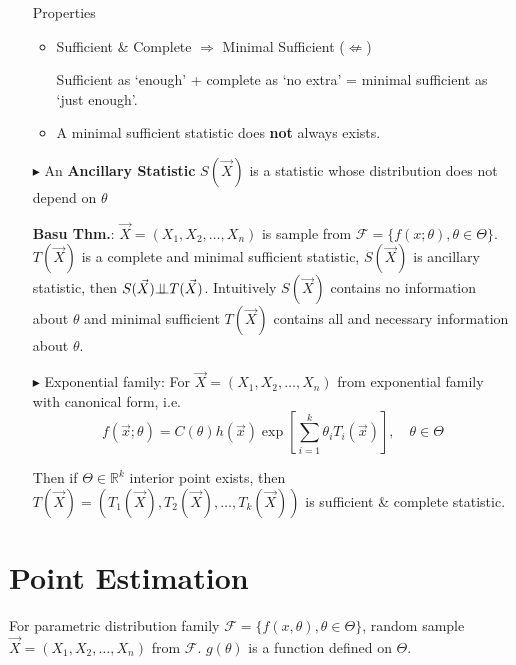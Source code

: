 \begin{itemize}
        Properties
        \begin{itemize}[topsep=2pt,itemsep=0pt]
            \item Sufficient \& Complete $\Rightarrow $ Minimal Sufficient ($ \not\Leftarrow $)
            
            Sufficient as `enough' + complete as `no extra' = minimal sufficient as `just enough'.
            

            \item A minimal sufficient statistic does \textbf{not} always exists.
        \end{itemize}
        
        \item[$\blacktriangleright$]  An \textbf{Ancillary Statistic} $S(\vec{X})$ is a statistic whose distribution does not depend on $\theta$
        
        \textbf{Basu Thm.}: $\vec{X}=(X_1,X_2,\ldots,X_n)$ is sample from $\mathscr{F}=\{f(x;\theta),\theta\in\Theta\}$. $T(\vec{X})$ is a complete and minimal sufficient statistic, $S(\vec{X})$ is ancillary statistic, then $S(\vec{X})\bot\!\!\!\bot T(\vec{X})$. Intuitively $ S(\vec{X}) $ contains no information about $ \theta  $ and minimal sufficient $ T(\vec{X}) $ contains all and necessary information about $ \theta  $.

        \item[$\blacktriangleright$] Exponential family: For $\vec{X}=(X_1,X_2,\ldots,X_n)$ from exponential family with canonical form, i.e.
    \begin{equation}
        f(\vec{x};\theta)=C(\theta)h(\vec{x})\exp\left[\sum_{i=1}^k \theta_i T_i(\vec{x})\right] ,\quad \theta\in\Theta
    \end{equation}

    Then if $\Theta\in\mathbb{R}^k$ interior point exists, then $T(\vec{X})=(T_1(\vec{X}),T_2(\vec{X}),\ldots,T_k(\vec{X}))$ is sufficient \& complete statistic.


\end{itemize} 




\section{Point Estimation}\label{SectionPointEstimation}
    For parametric distribution family $\mathscr{F}=\{f(x,\theta),\theta\in\Theta\}$, random sample $\vec{X}=(X_1,X_2,\ldots,X_n)$ from $\mathscr{F}$. $g(\theta)$ is a function defined on $\Theta$. 

